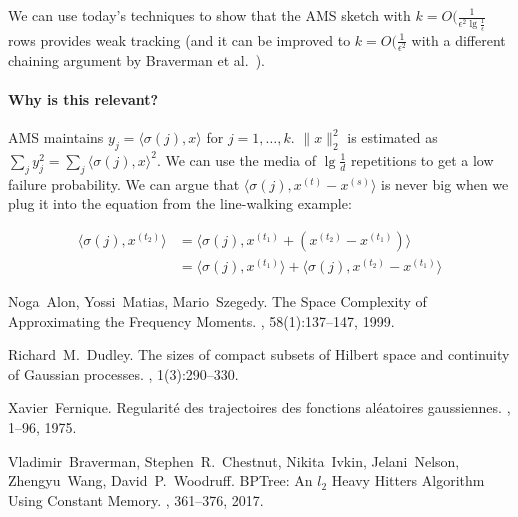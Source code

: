 \documentclass[11pt]{article}
\begin{document}
We can use today's techniques to show that the AMS sketch with $k=O(\frac{1}{\epsilon^2 \lg \frac{1}{\epsilon}}$ rows provides weak tracking (and it can be improved to $k=O(\frac{1}{\epsilon^2}$ with a different chaining argument by Braverman et al.~\cite{Braverman17}).  

\paragraph{Why is this relevant?} AMS maintains $y_j = \langle \sigma(j), x \rangle$ for $j = 1, \ldots, k$. $\lVert x \rVert_2^2$ is estimated as $\sum_j y_j^2 = \sum_j \langle \sigma(j), x \rangle^2$. We can use the media of $\lg \frac{1}{d}$ repetitions to get a low failure probability. We can argue that  $\langle \sigma(j), x^{(t)}-x^{(s)} \rangle$ is never big when we plug it into the equation from the line-walking example: 

\begin{align*}
\langle \sigma(j), x^{(t_2)} \rangle &=  \langle \sigma(j), x^{(t_1)}+(x^{(t_2)}-x^{(t_1)}) \rangle \\
  								 {}  &=  \langle \sigma(j), x^{(t_1)} \rangle + \langle \sigma(j), x^{(t_2)}-x^{(t_1)} \rangle
\end{align*}






\begin{thebibliography}{42}

Noga~Alon, Yossi~Matias, Mario~Szegedy.
\newblock The Space Complexity of Approximating the Frequency Moments.
, 58(1):137--147, 1999.

Richard~M.~Dudley.
\newblock The sizes of compact subsets of Hilbert space and continuity of Gaussian processes.
, 1(3):290--330.

Xavier~Fernique.
\newblock Regularit{\'e} des trajectoires des fonctions al{\'e}atoires gaussiennes.
, 1--96, 1975.

Vladimir~Braverman, Stephen~R.~Chestnut, Nikita~Ivkin, Jelani~Nelson, Zhengyu~Wang, David~P.~Woodruff.
\newblock BPTree: An $l_2$ Heavy Hitters Algorithm Using Constant Memory.
, 361--376, 2017.
\end{thebibliography}
\end{document}
